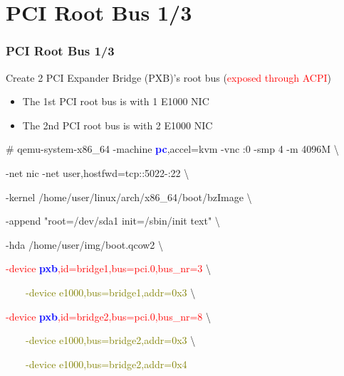 \documentclass[aspectratio=169]{beamer}
\begin{document}

\section{PCI Root Bus 1/3}
\begin{frame}
\frametitle{PCI Root Bus 1/3}
{\Large Create 2 PCI Expander Bridge (PXB)'s root bus (\textcolor{red}{exposed through ACPI})}
\begin{itemize}
\item The 1st PCI root bus is with 1 E1000 NIC
\item The 2nd PCI root bus is with 2 E1000 NIC
\end{itemize}
\begin{block}{}

\# qemu-system-x86\_64 -machine \textbf{\textcolor{blue}{pc}},accel=kvm -vnc :0 -smp 4 -m 4096M \textbackslash

-net nic -net user,hostfwd=tcp::5022-:22 \textbackslash

-kernel /home/user/linux/arch/x86\_64/boot/bzImage \textbackslash
	
-append "root=/dev/sda1 init=/sbin/init text" \textbackslash

-hda /home/user/img/boot.qcow2 \textbackslash

\textcolor{red}{-device \textbf{\textcolor{blue}{pxb}},id=bridge1,bus=pci.0,bus\_nr=3} \textbackslash

\textcolor{olive}{\ \ \ \ -device e1000,bus=bridge1,addr=0x3} \textbackslash

\textcolor{red}{-device \textbf{\textcolor{blue}{pxb}},id=bridge2,bus=pci.0,bus\_nr=8} \textbackslash

\textcolor{olive}{\ \ \ \ -device e1000,bus=bridge2,addr=0x3} \textbackslash

\textcolor{olive}{\ \ \ \ -device e1000,bus=bridge2,addr=0x4}

\end{block}
\end{frame}

\end{document}
